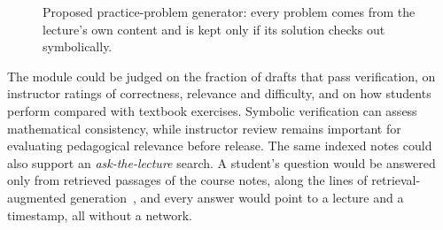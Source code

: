\documentclass[11pt,a4paper,oneside]{report}
\theoremstyle{definition}
\begin{document}
\begin{figure}[ht]
\centering
{}
\caption{Proposed practice-problem generator: every problem comes from the lecture's own content and is kept only if its solution checks out symbolically.}
\label{fig:practice}
\end{figure}

The module could be judged on the fraction of drafts that pass verification, on instructor ratings of correctness, relevance and difficulty, and on how students perform compared with textbook exercises. Symbolic verification can assess mathematical consistency, while instructor review remains important for evaluating pedagogical relevance before release. The same indexed notes could also support an \emph{ask-the-lecture} search. A student's question would be answered only from retrieved passages of the course notes, along the lines of retrieval-augmented generation~\cite{lewis2020rag}, and every answer would point to a lecture and a timestamp, all without a network.
\end{document}
